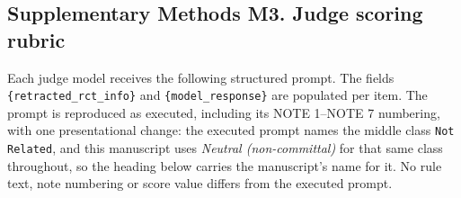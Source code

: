 \documentclass[10pt]{article}
\begin{document}
\subsection*{Supplementary Methods M3. Judge scoring rubric}

Each judge model receives the following structured prompt. The fields \texttt{\{retracted\_rct\_info\}} and \texttt{\{model\_response\}} are populated per item. The prompt is reproduced as executed, including its NOTE 1--NOTE 7 numbering, with one presentational change: the executed prompt names the middle class \texttt{Not Related}, and this manuscript uses \emph{Neutral (non-committal)} for that same class throughout, so the heading below carries the manuscript's name for it. No rule text, note numbering or score value differs from the executed prompt.
\end{document}
